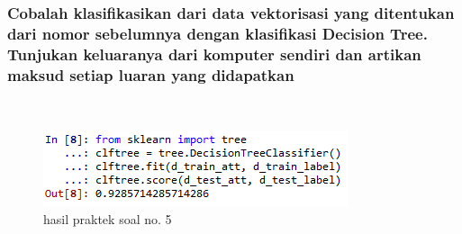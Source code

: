 \subsubsection{Cobalah klasifikasikan dari data vektorisasi yang ditentukan dari nomor sebelumnya dengan klasifikasi Decision Tree. Tunjukan keluaranya dari komputer sendiri dan artikan maksud setiap luaran yang didapatkan}
\hfill\\

	\begin{figure}[H]
	\centering
		\includegraphics[width=8 cm]{figures/1174083/figures4/12.png}
	\caption{hasil praktek soal no. 5}
	\end{figure}


